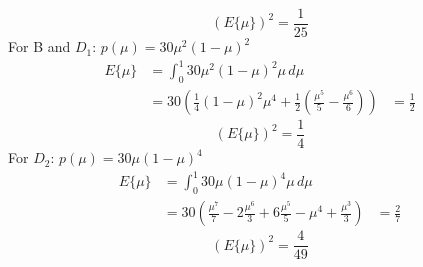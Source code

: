 \begin{equation*}
(E\{\mu\})^2 = \frac{1}{25}
\end{equation*}
For B and $D_1$: $p(\mu) = 30\mu^2(1-\mu)^2$
\begin{align*}
E\{\mu\} &= \int_0^1 30\mu^2(1-\mu)^2\mu \,d\mu \\
&= 30 (\frac{1}{4}(1-\mu)^2\mu^4 + \frac{1}{2}(\frac{\mu^5}{5} - \frac{\mu^6}{6}))
&= \frac{1}{2}
\end{align*}
\begin{equation*}
(E\{\mu\})^2 = \frac{1}{4}
\end{equation*}
For $D_2$: $p(\mu) = 30\mu(1-\mu)^4$
\begin{align*}
E\{\mu\} &= \int_0^1 30\mu(1-\mu)^4\mu \,d\mu \\
&= 30 (\frac{\mu^7}{7} - 2\frac{\mu^6}{3} + 6\frac{\mu^5}{5} - \mu^4 + \frac{\mu^3}{3})
&= \frac{2}{7}
\end{align*}
\begin{equation*}
(E\{\mu\})^2 = \frac{4}{49}
\end{equation*}
